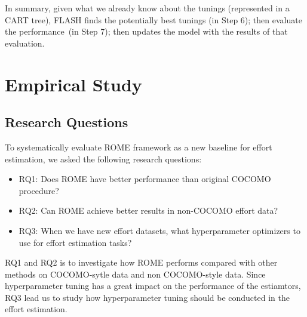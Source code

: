 \documentclass[sigconf,review]{acmart}
\newcommand{\bi}{\begin{itemize}}
\newcommand{\ei}{\end{itemize}}
\begin{document}


In summary,  given what we already know about the tunings (represented in a CART tree),
FLASH finds the potentially best tunings (in Step 6); then evaluate the performance~(in Step 7); 
then  updates the model with the results of that evaluation.



\section{Empirical Study} \label{sect:study} 
\subsection{Research Questions}
To systematically evaluate ROME framework as a new baseline for effort estimation,  we asked the following research questions:
\bi
\item RQ1: Does ROME have better performance than original COCOMO procedure?
\item RQ2: Can ROME achieve better results in non-COCOMO effort data?
\item RQ3: When we have new effort datasets, what hyperparameter optimizers to use for effort estimation tasks?
\ei
RQ1 and RQ2 is to investigate how ROME performs compared with other methods on COCOMO-sytle data and non COCOMO-style data. Since hyperparameter tuning has a great impact on the performance of the estiamtors, RQ3 lead us to study how hyperparameter tuning should be conducted in the effort estimation. 
\end{document}
